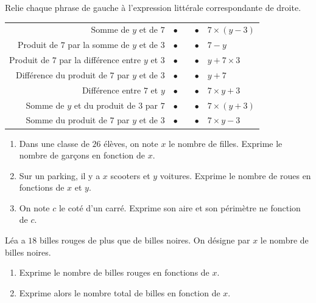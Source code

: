 \documentclass[a4paper,10pt]{report}
\begin{document}
\vspace{-1mm}
\begin{ex}
Relie chaque phrase de gauche à l'expression littérale correspondante de droite.

\renewcommand{\arraystretch}{1.1}
\begin{tabularx}{14cm}{r c X c l}
Somme de $y$ et de $7$ & $\bullet$ & & $\bullet$ & $7 \times (y-3)$ \\
Produit de $7$ par la somme de $y$ et de $3$ & $\bullet$ & & $\bullet$ & $7-y$ \\
Produit de $7$ par la différence entre $y$ et $3$ & $\bullet$ & & $\bullet$ & $y+7\times 3$ \\
Différence du produit de $7$ par $y$ et de $3$ & $\bullet$ & & $\bullet$ & $y+7$ \\
Différence entre $7$ et $y$ & $\bullet$ & & $\bullet$ & $7 \times y + 3$ \\
Somme de $y$ et du produit de $3$ par $7$ & $\bullet$& & $\bullet$ & $7 \times (y+3)$ \\
Somme du produit de $7$ par $y$ et de $3$ & $\bullet$& & $\bullet$ & $7 \times y - 3$ \\
\end{tabularx}
\end{ex}

\vspace{-1mm}
\begin{ex}

\begin{enumerate}[font=\color{exer1}]
\item Dans une classe de $26$ élèves, on note $x$ le nombre de filles. Exprime le nombre de garçons en fonction de $x$.
\item Sur un parking, il y a $x$ scooters et $y$ voitures. Exprime le nombre de roues en fonctions de $x$ et $y$.
\item On note $c$ le coté d'un carré. Exprime son aire et son périmètre ne fonction de $c$.
\end{enumerate}
\end{ex}

\vspace{-1mm}
\begin{ex}
Léa a $18$ billes rouges de plus que de billes noires. On désigne par $x$ le nombre de billes noires.

\begin{enumerate}[font=\color{exer1}]
\item Exprime le nombre de billes rouges en fonctions de $x$.
\item Exprime alors le nombre total de billes en fonction de $x$.
\end{enumerate}
\end{ex}
\end{document}
